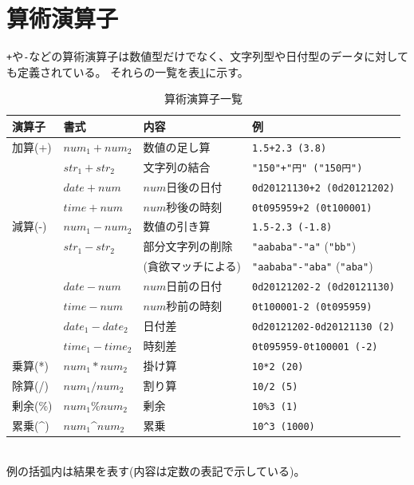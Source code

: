 \section{算術演算子}
\verb|+|や\verb|-|などの算術演算子は数値型だけでなく、文字列型や日付型のデータに対しても定義されている。
それらの一覧を表\ref{tbl:mcal_ope}に示す。
\begin{table}[!hb]
\begin{center}
\caption{算術演算子一覧\label{tbl:mcal_ope}}
{\small
  \begin{tabular}{l|l|l|l} \hline
演算子&書式&内容&例\\
\hline
加算(+) & $num_1+num_2$ & 数値の足し算    & \verb|1.5+2.3 (3.8)|\\
        & $str_1+str_2$ & 文字列の結合    & \verb|"150"+"円" ("150円")|\\
        & $date+num$    & $num$日後の日付 & \verb|0d20121130+2 (0d20121202)|\\
        & $time+num$    & $num$秒後の時刻 & \verb|0t095959+2 (0t100001)|\\
\hline
減算(-) & $num_1-num_2$   & 数値の引き算       & \verb|1.5-2.3 (-1.8)|\\
        & $str_1-str_2$   & 部分文字列の削除   & \verb|"aababa"-"a"| (\verb|"bb"|)\\
        &                 & (貪欲マッチによる) & \verb|"aababa"-"aba"| (\verb|"aba"|)\\
        & $date-num$      & $num$日前の日付    & \verb|0d20121202-2 (0d20121130)|\\
        & $time-num$      & $num$秒前の時刻    & \verb|0t100001-2 (0t095959)|\\
        & $date_1-date_2$ & 日付差             & \verb|0d20121202-0d20121130 (2)|\\
        & $time_1-time_2$ & 時刻差             & \verb|0t095959-0t100001 (-2)|\\
\hline
乗算(*) & $num_1*num_2$ & 掛け算 & \verb|10*2 (20)|\\
\hline
除算(/) & $num_1/num_2$ & 割り算 & \verb|10/2 (5)|\\
\hline
剰余(\%) & $num_1\%num_2$ & 剰余 & \verb|10%3 (1)|\\
\hline
累乗(\^{}) & $num_1$\^{}$num_2$ & 累乗 & \verb|10^3 (1000)|\\

\hline
  \end{tabular}
\\例の括弧内は結果を表す(内容は定数の表記で示している)。
  }
  \end{center}
\end{table}

